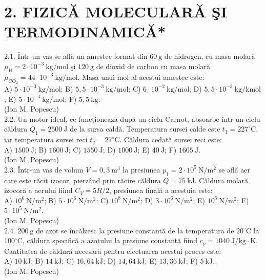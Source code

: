 
\section*{2. FIZICĂ MOLECULARĂ ŞI TERMODINAMICĂ*}
2.1. Într-un vas se află un amestec format din $60 \mathrm{~g}$ de hidrogen, cu masa molară $\mu_{\mathrm{H}}=2 \cdot 10^{-3} \mathrm{~kg} / \mathrm{mol}$ şi $120 \mathrm{~g}$ de dioxid de carbon cu masa molară $\mu_{\mathrm{CO_{2}}}=44 \cdot 10^{-3} \mathrm{~kg} / \mathrm{mol}$. Masa unui mol al acestui amestec este:\\ A) $5 \cdot 10^{-3} \mathrm{~kg} / \mathrm{mol}$; B) $5,5 \cdot 10^{-3} \mathrm{~kg} / \mathrm{mol}$; C) $6 \cdot 10^{-2} \mathrm{~kg} / \mathrm{mol}$; D) $5,5 \cdot 10^{-3} \mathrm{~kg} / \mathrm{kmol}$; E) $5 \cdot 10^{-4} \mathrm{~kg} / \mathrm{mol}$; F) $5,5 \mathrm{~kg}$.\\ (Ion M. Popescu)\\

2.2. Un motor ideal, ce funcționează după un ciclu Carnot, absoarbe într-un ciclu căldura $Q_{1}=2500 \mathrm{~J}$ de la sursa caldă. Temperatura sursei calde este $t_{1}=227^{\circ} \mathrm{C}$, iar temperatura sursei reci $t_{2}=27^{\circ} \mathrm{C}$. Căldura cedată sursei reci este:\\ A) $1500 \mathrm{~J}$; B) $1600 \mathrm{~J}$; C) $1550 \mathrm{~J}$; D) $1000 \mathrm{~J}$; E) $40 \mathrm{~J}$; F) $1605 \mathrm{~J}$.\\ (Ion M. Popescu)\\

2.3. Într-un vas de volum $V=0,3 \mathrm{~m}^{3}$ la presiunea $p_{1}=2 \cdot 10^{5} \mathrm{~N} / \mathrm{m}^{2}$ se află aer care este răcit izocor, pierzând prin răcire căldura $Q=75 \mathrm{~kJ}$. Căldura molară izocoră a aerului fiind $C_{V}=5 R / 2$, presiunea finală a acestuia este:\\ A) $10^{6} \mathrm{~N} / \mathrm{m}^{2}$; В) $5 \cdot 10^{6} \mathrm{~N} / \mathrm{m}^{2}$; C) $10^{8} \mathrm{~N} / \mathrm{m}^{2}$; D) $3 \cdot 10^{6} \mathrm{~N} / \mathrm{m}^{2}$; E) $10^{5} \mathrm{~N} / \mathrm{m}^{2}$; F) $5 \cdot 10^{5} \mathrm{~N} / \mathrm{m}^{2}$.\\ (Ion M. Popescu)\\

2.4. $200 \mathrm{~g}$ de azot se încălzesc la presiune constantă de la temperatura de $20^{\circ} \mathrm{C}$ la $100{ }^{\circ} \mathrm{C}$, căldura specifică a azotului la presiune constantă fiind $c_{p}=1040 \mathrm{~J} / \mathrm{kg} \cdot \mathrm{K}$. Cantitatea de căldură necesară pentru efectuarea acestui proces este:\\ A) $10 \mathrm{~kJ}$; B) $14 \mathrm{~kJ}$; C) $16,64 \mathrm{~kJ}$; D) $14,64 \mathrm{~kJ}$; E) $13,36 \mathrm{~kJ}$; F) $5 \mathrm{~kJ}$.\\ (Ion M. Popescu)\\

